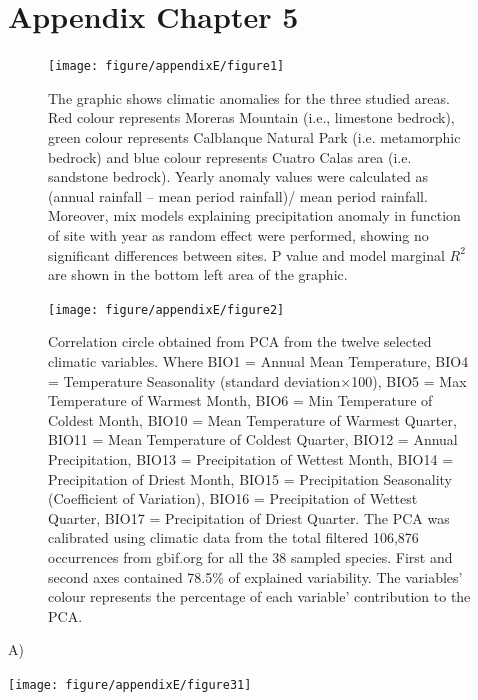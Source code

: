 \documentclass[11pt,twoside]{reedthesis}
\begin{document}
\chapter{Appendix Chapter 5}\label{appendix-chapter-5}

\newpage
\begin{figure}[hbt!]

{\centering \texttt{[image: figure/appendixE/figure1]} 

}

\caption[Climatic anomalies for the study sites]{The graphic shows climatic anomalies for the three studied areas. Red colour represents Moreras Mountain (i.e., limestone bedrock), green colour represents Calblanque Natural Park (i.e. metamorphic bedrock) and blue colour represents Cuatro Calas area (i.e. sandstone bedrock). Yearly anomaly values were calculated as (annual rainfall – mean period rainfall)/ mean period rainfall. Moreover, mix models explaining precipitation anomaly in function of site with year as random effect were performed, showing no significant differences between sites. P value and model marginal $R^2$ are shown in the bottom left area of the graphic.}\label{fig:unnamed-chunk-34}
\end{figure}\newpage
\begin{figure}[hbt!]

{\centering \texttt{[image: figure/appendixE/figure2]} 

}

\caption[Correlation circle obtained from PCA from the twelve selected climatic variables.]{Correlation circle obtained from PCA from the twelve selected climatic variables. Where BIO1 = Annual Mean Temperature, BIO4 = Temperature Seasonality (standard deviation×100), BIO5 = Max Temperature of Warmest Month, BIO6 = Min Temperature of Coldest Month, BIO10 = Mean Temperature of Warmest Quarter, BIO11 = Mean Temperature of Coldest Quarter, BIO12 = Annual Precipitation, BIO13 = Precipitation of Wettest Month, BIO14 = Precipitation of Driest Month, BIO15 = Precipitation Seasonality (Coefficient of Variation), BIO16 = Precipitation of Wettest Quarter, BIO17 = Precipitation of Driest Quarter. The PCA was calibrated using climatic data from the total filtered 106,876 occurrences from gbif.org for all the 38 sampled species. First and second axes contained 78.5\% of explained variability. The variables' colour represents the percentage of each variable' contribution to the PCA.}\label{fig:unnamed-chunk-35}
\end{figure}\newpage
A)\newline
\begin{center}\texttt{[image: figure/appendixE/figure31]} \end{center}
\end{document}
